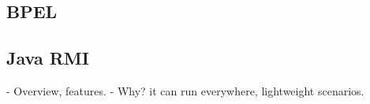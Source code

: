 \subsection{BPEL}
\subsection{Java RMI}
- Overview, features. - Why? it can run everywhere, lightweight scenarios.


% 



